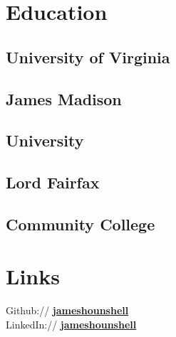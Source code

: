 \documentclass[]{resume}
\begin{document}
%
%
\lastupdated

%
%

%
%

\begin{minipage}[t]{0.3\textwidth} 

\section{Education} 

\subsection{University of Virginia}
\sectionsep

\subsection{James Madison}
\subsection{University}

\sectionsep

\subsection{Lord Fairfax }
\subsection{Community College}

\sectionsep



\section{Links} 
Github:// \href{https://github.com/jameshounshell}{\bf jameshounshell} \\
LinkedIn://  \href{https://www.linkedin.com/in/jameshounshell/}{\bf jameshounshell}
\vspace{3mm}


\end{minipage}
\end{document}
